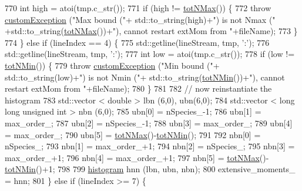 \begin{DoxyCode}
770             \textcolor{keywordtype}{int} high = atoi(tmp.c\_str());
771             \textcolor{keywordflow}{if} (high != \hyperlink{classsim_system_aee2c65ecb43a35c0c4d070cdb45f7dc0}{totNMax}()) \{
772                 \textcolor{keywordflow}{throw} \hyperlink{classcustom_exception}{customException} (\textcolor{stringliteral}{"Max bound ("}+ std::to\_string(high)+\textcolor{stringliteral}{") is not Nmax ("}
      +std::to\_string(\hyperlink{classsim_system_aee2c65ecb43a35c0c4d070cdb45f7dc0}{totNMax}())+\textcolor{stringliteral}{"), cannot restart extMom from "}+fileName);
773             \}
774         \} \textcolor{keywordflow}{else} \textcolor{keywordflow}{if} (lineIndex == 4) \{
775             std::getline(lineStream, tmp, \textcolor{charliteral}{':'});
776             std::getline(lineStream, tmp, \textcolor{charliteral}{':'});
777             \textcolor{keywordtype}{int} low = atoi(tmp.c\_str());
778             \textcolor{keywordflow}{if} (low != \hyperlink{classsim_system_af10842e0eaa638373b8717c87b47e6bc}{totNMin}()) \{
779                 \textcolor{keywordflow}{throw} \hyperlink{classcustom_exception}{customException} (\textcolor{stringliteral}{"Min bound ("}+ std::to\_string(low)+\textcolor{stringliteral}{") is not Nmin ("}+
      std::to\_string(\hyperlink{classsim_system_af10842e0eaa638373b8717c87b47e6bc}{totNMin}())+\textcolor{stringliteral}{"), cannot restart extMom from "}+fileName);
780             \}
781 
782             \textcolor{comment}{// now reinstantiate the histogram}
783             std::vector < double > lbn (6,0), ubn(6,0);
784             std::vector < long long unsigned int > nbn (6,0);
785             ubn[0] = nSpecies\_-1;
786             ubn[1] = max\_order\_;
787             ubn[2] = nSpecies\_-1;
788             ubn[3] = max\_order\_;
789             ubn[4] = max\_order\_;
790             ubn[5] = \hyperlink{classsim_system_aee2c65ecb43a35c0c4d070cdb45f7dc0}{totNMax}()-\hyperlink{classsim_system_af10842e0eaa638373b8717c87b47e6bc}{totNMin}();
791 
792             nbn[0] = nSpecies\_;
793             nbn[1] = max\_order\_+1;
794             nbn[2] = nSpecies\_;
795             nbn[3] = max\_order\_+1;
796             nbn[4] = max\_order\_+1;
797             nbn[5] = \hyperlink{classsim_system_aee2c65ecb43a35c0c4d070cdb45f7dc0}{totNMax}()-\hyperlink{classsim_system_af10842e0eaa638373b8717c87b47e6bc}{totNMin}()+1;
798 
799             \hyperlink{classhistogram}{histogram} hnn (lbn, ubn, nbn);
800             extensive\_moments\_ = hnn;
801         \} \textcolor{keywordflow}{else} \textcolor{keywordflow}{if} (lineIndex >= 7) \{

\end{DoxyCode}
